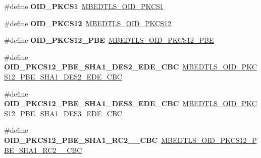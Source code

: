 \begin{DoxyCompactItemize}
\item 
\mbox{\label{compat-1_83_8h_affd3c6c6b6029897c09631c9e71b5775}} 
\#define {\bfseries O\+I\+D\+\_\+\+P\+K\+C\+S1}~\mbox{\hyperlink{oid_8h_afb1e14265b5d4e6e4bda16b4a2b9853c}{M\+B\+E\+D\+T\+L\+S\+\_\+\+O\+I\+D\+\_\+\+P\+K\+C\+S1}}
\item 
\mbox{\label{compat-1_83_8h_a040b6933c066ff76e97f957c922e0141}} 
\#define {\bfseries O\+I\+D\+\_\+\+P\+K\+C\+S12}~\mbox{\hyperlink{oid_8h_a54f5eedb526dfbb4fcb3f2de505f9c72}{M\+B\+E\+D\+T\+L\+S\+\_\+\+O\+I\+D\+\_\+\+P\+K\+C\+S12}}
\item 
\mbox{\label{compat-1_83_8h_a2557ce6cb40f5c109cb5887ae79fbd84}} 
\#define {\bfseries O\+I\+D\+\_\+\+P\+K\+C\+S12\+\_\+\+P\+BE}~\mbox{\hyperlink{oid_8h_accf72d47a7630266420e6ad7028908c8}{M\+B\+E\+D\+T\+L\+S\+\_\+\+O\+I\+D\+\_\+\+P\+K\+C\+S12\+\_\+\+P\+BE}}
\item 
\mbox{\label{compat-1_83_8h_a79f9a0b7005a98bf6daefbbf486dcbc6}} 
\#define {\bfseries O\+I\+D\+\_\+\+P\+K\+C\+S12\+\_\+\+P\+B\+E\+\_\+\+S\+H\+A1\+\_\+\+D\+E\+S2\+\_\+\+E\+D\+E\+\_\+\+C\+BC}~\mbox{\hyperlink{oid_8h_a082e4a3dfa00272ecf769887ad972697}{M\+B\+E\+D\+T\+L\+S\+\_\+\+O\+I\+D\+\_\+\+P\+K\+C\+S12\+\_\+\+P\+B\+E\+\_\+\+S\+H\+A1\+\_\+\+D\+E\+S2\+\_\+\+E\+D\+E\+\_\+\+C\+BC}}
\item 
\mbox{\label{compat-1_83_8h_a9f505cb7301c3ec55e71f33696d5191c}} 
\#define {\bfseries O\+I\+D\+\_\+\+P\+K\+C\+S12\+\_\+\+P\+B\+E\+\_\+\+S\+H\+A1\+\_\+\+D\+E\+S3\+\_\+\+E\+D\+E\+\_\+\+C\+BC}~\mbox{\hyperlink{oid_8h_afb21e2c15664c64c8ff0f3d6c88122dc}{M\+B\+E\+D\+T\+L\+S\+\_\+\+O\+I\+D\+\_\+\+P\+K\+C\+S12\+\_\+\+P\+B\+E\+\_\+\+S\+H\+A1\+\_\+\+D\+E\+S3\+\_\+\+E\+D\+E\+\_\+\+C\+BC}}
\item 
\mbox{\label{compat-1_83_8h_add1779affb28b8a7bed9dd474d82495d}} 
\#define {\bfseries O\+I\+D\+\_\+\+P\+K\+C\+S12\+\_\+\+P\+B\+E\+\_\+\+S\+H\+A1\+\_\+\+R\+C2\+\_\+\_\+\+C\+BC}~\mbox{\hyperlink{oid_8h_a93903ee8d6e915c4c03e991b0869ddd9}{M\+B\+E\+D\+T\+L\+S\+\_\+\+O\+I\+D\+\_\+\+P\+K\+C\+S12\+\_\+\+P\+B\+E\+\_\+\+S\+H\+A1\+\_\+\+R\+C2\+\_\+\_\+\+C\+BC}}
\item 
\mbox{\label{compat-1_83_8h_a1a772dde5d30e1e97a3c8d09e299060e}} 

\end{DoxyCompactItemize}

